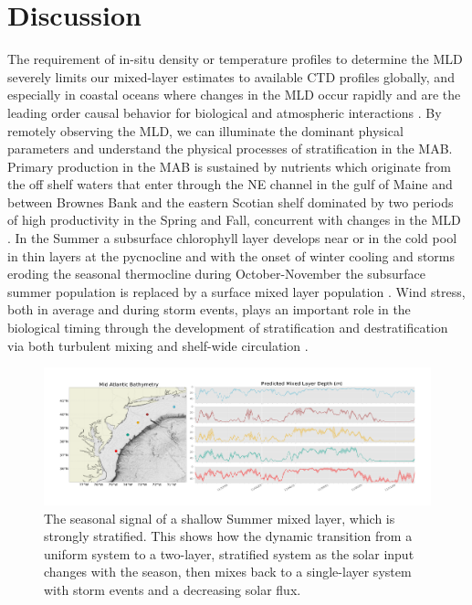 \documentclass{article}
\begin{document}
\section*{Discussion}
The requirement of in-situ density or temperature profiles to determine the MLD severely limits our mixed-layer estimates to available CTD profiles globally, and especially in coastal oceans where changes in the MLD occur rapidly and are the leading order causal behavior for biological \cite{walsh1988simulation,fernandez1996coupling,shroyer2014stratification} and atmospheric interactions \cite{Miles2013,Seroka2016}.
By remotely observing the MLD, we can illuminate the dominant physical parameters and understand the physical processes of stratification in the MAB.
Primary production in the MAB is sustained by nutrients which originate from the off shelf waters that enter through the NE channel in the gulf of Maine and between Brownes Bank and the eastern Scotian shelf dominated by two periods of high productivity in the Spring and Fall, concurrent with changes in the MLD \cite{bigelow1933studies,marra1990phytoplankton,friedland2015spring}.
In the Summer a subsurface chlorophyll layer develops near or in the cold pool in thin layers at the pycnocline and with the onset of winter cooling and storms eroding the seasonal thermocline during October-November the subsurface summer population is replaced by a surface mixed layer population \cite{flagg1994interaction}.
Wind stress, both in average and during storm events, plays an important role in the biological timing through the development of stratification and destratification via both turbulent mixing and shelf-wide circulation \cite{Austin2002,xu2013role}.
\begin{figure}[h]
\caption{The seasonal signal of a shallow Summer mixed layer, which is strongly stratified. This shows how the dynamic transition from a uniform system to a two-layer, stratified system as the solar input changes with the season, then mixes back to a single-layer system with storm events and a decreasing solar flux.}
\centering
\includegraphics[width=1.0\textwidth, keepaspectratio]{predicted_ML_MAB_shallowing.pdf}
\end{figure}
\end{document}
